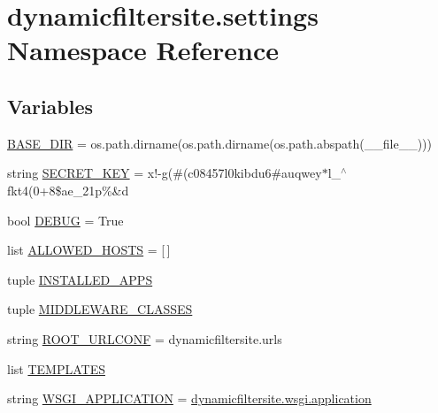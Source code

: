 \hypertarget{namespacedynamicfiltersite_1_1settings}{}\section{dynamicfiltersite.\+settings Namespace Reference}
\label{namespacedynamicfiltersite_1_1settings}
\subsection*{Variables}
\begin{DoxyCompactItemize}
\item 
\mbox{\hyperlink{namespacedynamicfiltersite_1_1settings_a6c7db55cb69a3846d254023debc5b6b6}{B\+A\+S\+E\+\_\+\+D\+IR}} = os.\+path.\+dirname(os.\+path.\+dirname(os.\+path.\+abspath(\+\_\+\+\_\+file\+\_\+\+\_\+)))
\item 
string \mbox{\hyperlink{namespacedynamicfiltersite_1_1settings_a4979e7faaf927fd6eff9849411f9e3c6}{S\+E\+C\+R\+E\+T\+\_\+\+K\+EY}} = \textquotesingle{}x!-\/g(\#(c08457l0kibdu6\#auqwey$\ast$l\+\_\+$^\wedge$fkt4(0+8\$ae\+\_\+21p\%\&d\textquotesingle{}
\item 
bool \mbox{\hyperlink{namespacedynamicfiltersite_1_1settings_a117352cc494cc62c6b2f1882786a332c}{D\+E\+B\+UG}} = True
\item 
list \mbox{\hyperlink{namespacedynamicfiltersite_1_1settings_a1c65930ce3d00aea720781bc9c17b0b8}{A\+L\+L\+O\+W\+E\+D\+\_\+\+H\+O\+S\+TS}} = \mbox{[}$\,$\mbox{]}
\item 
tuple \mbox{\hyperlink{namespacedynamicfiltersite_1_1settings_a26c8442859071cd278fe3fe6485ea4f3}{I\+N\+S\+T\+A\+L\+L\+E\+D\+\_\+\+A\+P\+PS}}
\item 
tuple \mbox{\hyperlink{namespacedynamicfiltersite_1_1settings_a625748b6f9b2b18184a1f5447b74d728}{M\+I\+D\+D\+L\+E\+W\+A\+R\+E\+\_\+\+C\+L\+A\+S\+S\+ES}}
\item 
string \mbox{\hyperlink{namespacedynamicfiltersite_1_1settings_aeea25bc27cd24a96741399e2068f3531}{R\+O\+O\+T\+\_\+\+U\+R\+L\+C\+O\+NF}} = \textquotesingle{}dynamicfiltersite.\+urls\textquotesingle{}
\item 
list \mbox{\hyperlink{namespacedynamicfiltersite_1_1settings_a24cf38fb957c013ca45af12cb44f1337}{T\+E\+M\+P\+L\+A\+T\+ES}}
\item 
string \mbox{\hyperlink{namespacedynamicfiltersite_1_1settings_a9c343ae6b8eb80ef2de562528f3f00b9}{W\+S\+G\+I\+\_\+\+A\+P\+P\+L\+I\+C\+A\+T\+I\+ON}} = \textquotesingle{}\mbox{\hyperlink{namespacedynamicfiltersite_1_1wsgi_a9556574144704032c9e6bafa10276622}{dynamicfiltersite.\+wsgi.\+application}}\textquotesingle{}

\end{DoxyCompactItemize}
